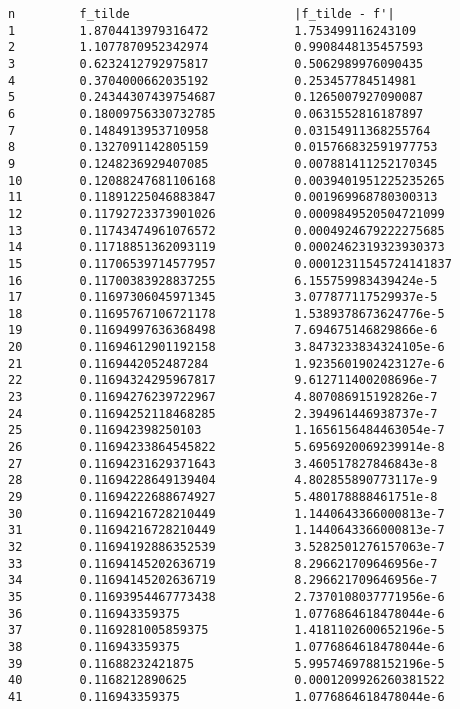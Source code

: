 \documentclass{article}
\begin{document}
\begin{verbatim}
n         f_tilde                       |f_tilde - f'|
1         1.8704413979316472            1.753499116243109
2         1.1077870952342974            0.9908448135457593
3         0.6232412792975817            0.5062989976090435
4         0.3704000662035192            0.253457784514981
5         0.24344307439754687           0.1265007927090087
6         0.18009756330732785           0.0631552816187897
7         0.1484913953710958            0.03154911368255764
8         0.1327091142805159            0.015766832591977753
9         0.1248236929407085            0.007881411252170345
10        0.12088247681106168           0.0039401951225235265
11        0.11891225046883847           0.001969968780300313
12        0.11792723373901026           0.0009849520504721099
13        0.11743474961076572           0.0004924679222275685
14        0.11718851362093119           0.0002462319323930373
15        0.11706539714577957           0.00012311545724141837
16        0.11700383928837255           6.155759983439424e-5
17        0.11697306045971345           3.077877117529937e-5
18        0.11695767106721178           1.5389378673624776e-5
19        0.11694997636368498           7.694675146829866e-6
20        0.11694612901192158           3.8473233834324105e-6
21        0.1169442052487284            1.9235601902423127e-6
22        0.11694324295967817           9.612711400208696e-7
23        0.11694276239722967           4.807086915192826e-7
24        0.11694252118468285           2.394961446938737e-7
25        0.116942398250103             1.1656156484463054e-7
26        0.11694233864545822           5.6956920069239914e-8
27        0.11694231629371643           3.460517827846843e-8
28        0.11694228649139404           4.802855890773117e-9
29        0.11694222688674927           5.480178888461751e-8
30        0.11694216728210449           1.1440643366000813e-7
31        0.11694216728210449           1.1440643366000813e-7
32        0.11694192886352539           3.5282501276157063e-7
33        0.11694145202636719           8.296621709646956e-7
34        0.11694145202636719           8.296621709646956e-7
35        0.11693954467773438           2.7370108037771956e-6
36        0.116943359375                1.0776864618478044e-6
37        0.1169281005859375            1.4181102600652196e-5
38        0.116943359375                1.0776864618478044e-6
39        0.11688232421875              5.9957469788152196e-5
40        0.1168212890625               0.0001209926260381522
41        0.116943359375                1.0776864618478044e-6

\end{verbatim}
\end{document}
